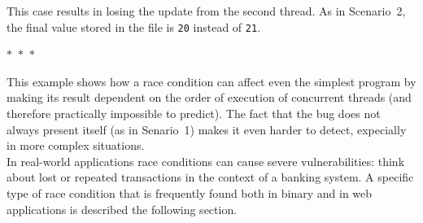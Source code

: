 This case results in losing the update from the second thread. As in Scenario~2, the final value stored in the file is \texttt{20} instead of \texttt{21}.

\begin{center}
  $\ast$~$\ast$~$\ast$
\end{center}

This example shows how a race condition can affect even the simplest program by making its result dependent on the order of execution of concurrent threads (and therefore practically impossible to predict). The fact that the bug does not always present itself (as in Senario~1) makes it even harder to detect, expecially in more complex situations. \\

In real-world applications race conditions can cause severe vulnerabilities: think about lost or repeated transactions in the context of a banking system. A specific type of race condition that is frequently found both in binary and in web applications is described the following section.

